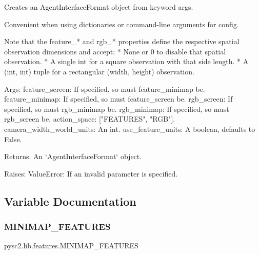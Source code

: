 \begin{DoxyVerb}Creates an AgentInterfaceFormat object from keyword args.

Convenient when using dictionaries or command-line arguments for config.

Note that the feature_* and rgb_* properties define the respective spatial
observation dimensions and accept:
    * None or 0 to disable that spatial observation.
    * A single int for a square observation with that side length.
    * A (int, int) tuple for a rectangular (width, height) observation.

Args:
  feature_screen: If specified, so must feature_minimap be.
  feature_minimap: If specified, so must feature_screen be.
  rgb_screen: If specified, so must rgb_minimap be.
  rgb_minimap: If specified, so must rgb_screen be.
  action_space: ["FEATURES", "RGB"].
  camera_width_world_units: An int.
  use_feature_units: A boolean, defaults to False.

Returns:
  An `AgentInterfaceFormat` object.

Raises:
  ValueError: If an invalid parameter is specified.
\end{DoxyVerb}
 

\subsection{Variable Documentation}
\mbox{\label{namespacepysc2_1_1lib_1_1features_aa68d4b004db555d191b198bcf0d0e699}} 
\subsubsection{\texorpdfstring{M\+I\+N\+I\+M\+A\+P\+\_\+\+F\+E\+A\+T\+U\+R\+ES}{MINIMAP\_FEATURES}}
{\footnotesize\ttfamily pysc2.\+lib.\+features.\+M\+I\+N\+I\+M\+A\+P\+\_\+\+F\+E\+A\+T\+U\+R\+ES}

